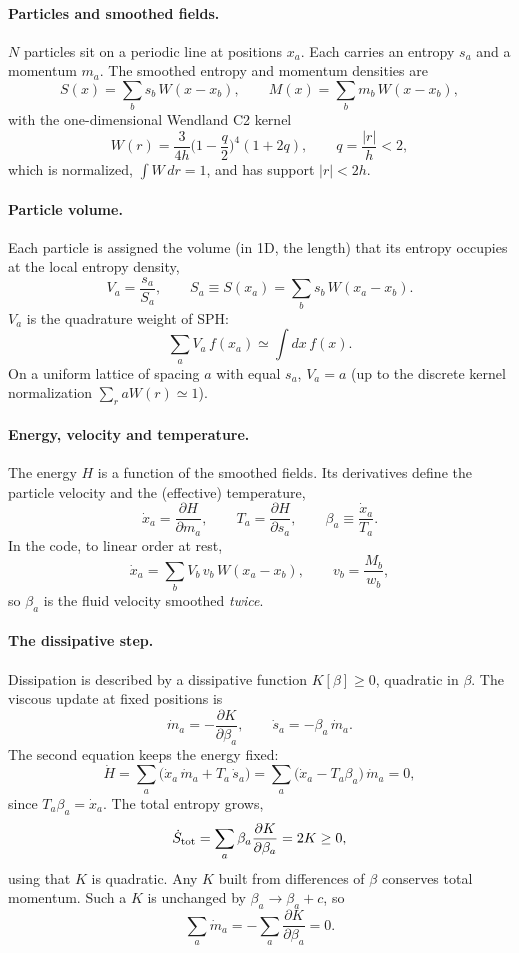 \documentclass[11pt,aps,preprint,nofootinbib,superscriptaddress,tightenlines]{revtex4-2}
\def\st{\begin{equation}}
\def\stp{\end{equation}}
\let\oldparagraph\paragraph
\renewcommand{\paragraph}{\par\bigskip\oldparagraph}
\begin{document}
\paragraph{Particles and smoothed fields.}
$N$ particles sit on a periodic line at positions $x_a$.  Each carries an
entropy $s_a$ and a momentum $m_a$.  The smoothed entropy and momentum
densities are
\st
S(x)=\sum_b s_b\,W(x-x_b),\qquad M(x)=\sum_b m_b\,W(x-x_b),
\stp
with the one-dimensional Wendland C2 kernel
\st
W(r)=\frac{3}{4h}\Big(1-\frac{q}{2}\Big)^4(1+2q),\qquad q=\frac{|r|}{h}<2,
\label{W}
\stp
which is normalized, $\int W\,dr=1$, and has support $|r|<2h$.

\paragraph{Particle volume.}  Each particle is assigned the volume (in 1D, the
length) that its entropy occupies at the local entropy density,
\st
V_a=\frac{s_a}{S_a},\qquad S_a\equiv S(x_a)=\sum_bs_b\,W(x_a-x_b).
\label{Va}
\stp
$V_a$ is the quadrature weight of SPH:
\st
\sum_aV_a\,f(x_a)\simeq\int dx\,f(x).
\stp
On a uniform lattice of spacing $a$ with equal $s_a$, $V_a=a$ (up to the
discrete kernel normalization $\sum_raW(r)\simeq1$).

\paragraph{Energy, velocity and temperature.}  The energy $H$ is a
function of the smoothed fields.  Its derivatives define the particle velocity
and the (effective) temperature,
\st
\dot x_a=\frac{\partial H}{\partial m_a},\qquad
T_a=\frac{\partial H}{\partial s_a},\qquad
\beta_a\equiv\frac{\dot x_a}{T_a}.
\label{Ta}
\stp
In the code, to linear order at rest,
\st
\dot x_a=\sum_b V_b\,v_b\,W(x_a-x_b),\qquad v_b=\frac{M_b}{w_b},
\stp
so $\beta_a$ is the fluid velocity smoothed \emph{twice}.

\paragraph{The dissipative step.}
Dissipation is described by a dissipative function $K[\beta]\ge0$, quadratic
in $\beta$.  The viscous update at fixed positions is
\st
\dot m_a=-\frac{\partial K}{\partial \beta_a},\qquad
\dot s_a=-\beta_a\,\dot m_a .
\label{generic}
\stp
The second equation keeps the energy fixed:
\st
\dot H=\sum_a\big(\dot x_a\,\dot m_a+T_a\,\dot s_a\big)
=\sum_a\big(\dot x_a-T_a\beta_a\big)\,\dot m_a=0 ,
\stp
since $T_a\beta_a=\dot x_a$.  The total entropy grows,
\st
\dot S_{\rm tot}=\sum_a\beta_a\frac{\partial K}{\partial\beta_a}=2K\ge0,
\stp
using that $K$ is quadratic.  Any $K$ built from differences of $\beta$
conserves total momentum.  Such a $K$ is unchanged by $\beta_a\to\beta_a+c$,
so
\st
\sum_a\dot m_a=-\sum_a\frac{\partial K}{\partial\beta_a}=0 .
\stp
\end{document}
